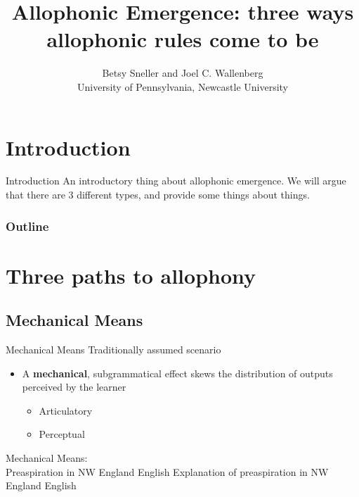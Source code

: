 \documentclass[hyperref={pdfpagelabels=false}]{beamer}
\title{Allophonic Emergence: three ways allophonic rules come to be}
\author{Betsy Sneller and Joel C. Wallenberg \\ University of Pennsylvania, Newcastle University}
\institute{}
\begin{document}
\begin{frame}[plain]
\titlepage
\end{frame}

\section{Introduction}
\begin{frame}{Introduction}
	An introductory thing about allophonic emergence. We will argue that there are 3 different types, and provide some things about things.
			
\end{frame}

\begin{frame}
\frametitle{Outline}
\tableofcontents
\end{frame}

\section{Three paths to allophony}
\subsection{Mechanical Means}

\begin{frame}{Mechanical Means}
	Traditionally assumed scenario \cite{ohala1983, ohala1989} \\
	\begin{itemize}
		\item A \textbf{mechanical}, subgrammatical effect skews the distribution of outputs perceived by the learner 
		\begin{itemize}
			\item Articulatory
			\item Perceptual
		\end{itemize}
	\end{itemize}
\end{frame}

\begin{frame}{Mechanical Means: \\ \small{Preaspiration in NW England English}}
Explanation of preaspiration in NW England English %

\end{frame}
\end{document}
